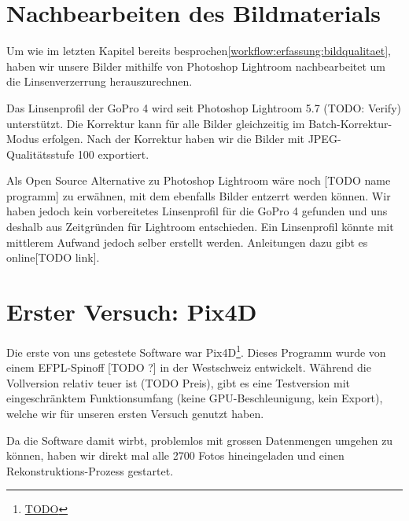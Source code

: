 
\section{Nachbearbeiten des Bildmaterials}

Um wie im letzten Kapitel bereits
besprochen\ref{workflow:erfassung:bildqualitaet}, haben wir unsere Bilder
mithilfe von Photoshop Lightroom nachbearbeitet um die Linsenverzerrung
herauszurechnen.

Das Linsenprofil der GoPro 4 wird seit Photoshop Lightroom 5.7 (TODO: Verify)
unterstützt. Die Korrektur kann für alle Bilder gleichzeitig im
Batch-Korrektur-Modus erfolgen. Nach der Korrektur haben wir die Bilder mit
JPEG-Qualitätsstufe 100 exportiert.

Als Open Source Alternative zu Photoshop Lightroom wäre noch [TODO name
programm] zu erwähnen, mit dem ebenfalls Bilder entzerrt werden können. Wir
haben jedoch kein vorbereitetes Linsenprofil für die GoPro 4 gefunden und uns
deshalb aus Zeitgründen für Lightroom entschieden. Ein Linsenprofil könnte mit
mittlerem Aufwand jedoch selber erstellt werden. Anleitungen dazu gibt es
online[TODO link].


\section{Erster Versuch: Pix4D}

Die erste von uns getestete Software war Pix4D\footnote{\url{TODO}}. Dieses
Programm wurde von einem EFPL-Spinoff [TODO ?] in der Westschweiz entwickelt.
Während die Vollversion relativ teuer ist (TODO Preis), gibt es eine Testversion
mit eingeschränktem Funktionsumfang (keine GPU-Beschleunigung, kein Export),
welche wir für unseren ersten Versuch genutzt haben.

Da die Software damit wirbt, problemlos mit grossen Datenmengen umgehen zu
können, haben wir direkt mal alle 2700 Fotos hineingeladen und einen
Rekonstruktions-Prozess gestartet.
